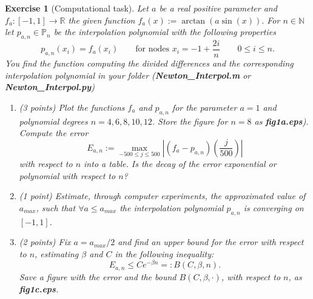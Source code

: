 \documentclass[11pt,a4paper,english,hyperref]{article}
\newcounter{aufgabeNummer}
\theoremstyle{break}   %
\newtheorem{Aufgabe}[aufgabeNummer]{Exercise}
\newcommand\R{\mathbb{R}}
\newcommand\N{\mathbb{N}}
\renewcommand\P{\mathbb{P}}
\begin{document}
\begin{Aufgabe}[Computational task]
Let $a$ be a real positive parameter and $f_a:\left[ -1, 1 \right] \to \R$ the given function $f_a(x):= \arctan (a\sin(x)).$ For $n\in \N$ let $p_{a,n}\in \P_n$ be the interpolation polynomial with the following properties
$$
p_{a,n}(x_i)=f_a(x_i)\qquad \text{for nodes }x_i=-1+\frac{2i}{n}\qquad 0\leq i \leq n.
$$
You find the function computing the divided differences and the corresponding interpolation polynomial in your folder (\textbf{Newton\_Interpol.m} or \textbf{Newton\_Interpol.py})
\begin{enumerate}
\item (3 points) Plot the functions $f_a$ and $p_{a,n}$ for the parameter $a=1$ and polynomial degrees $n=4,6,8,10,12$. Store the figure for \(n=8\) as \textbf{fig1a.eps}). Compute the error
$$
E_{a,n}:=\max_{-500\leq j \leq 500} \left| (f_a-p_{a,n})\left(\frac{j}{500}\right) \right|
$$
with respect to \(n\) into a table. Is the decay of the error exponential or polynomial with respect to $n$?
\item (1 point) Estimate, through computer experiments, the approximated value of $a_{max}$, such that $\forall a\leq a_{max}$ the interpolation polynomial $p_{a,n}$ is converging on $\left[ -1,1 \right]$. 
\item(2 points) Fix $a=a_{max}/2$ and find an upper bound for the error  with respect to $n$, estimating $\beta$ and $C$ in the following inequality:
$$
E_{a,n}\leq C e^{-\beta n}=:B(C,\beta,n).
$$
Save a figure with the error and the bound $B(C,\beta,\cdot)$, with respect to $n$, as \textbf{fig1c.eps}.
\end{enumerate}
\end{Aufgabe}
\newpage
\end{document}
